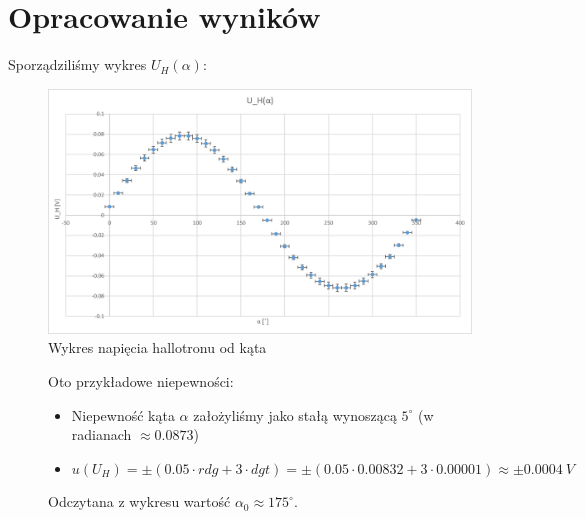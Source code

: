 \documentclass{article}
\begin{document}
\newpage

\section{Opracowanie wyników}

Sporządziliśmy wykres $U_{H}(\alpha)$:
\begin{figure}[h]
    \centering
    \includegraphics{U_H_od_ALFA.png}
    \caption{Wykres napięcia hallotronu od kąta}
    \label{fig:rys2}
\end{figure}

\begin{figure}[h]
    Oto przykładowe niepewności:
    \begin{itemize}
        \item Niepewność kąta $\alpha$ założyliśmy jako stałą wynoszącą $5^{\circ}$ (w radianach $\approx 0.0873$)
        \item $u(U_{H})=\pm(0.05\cdot rdg +3\cdot dgt)=\pm(0.05\cdot0.00832
     +3\cdot 0.00001)\approx\pm0.0004 \ V$
    \end{itemize}
    Odczytana z wykresu wartość $\alpha_{0} \approx 175^{\circ}$.
\end{figure}
\end{document}
